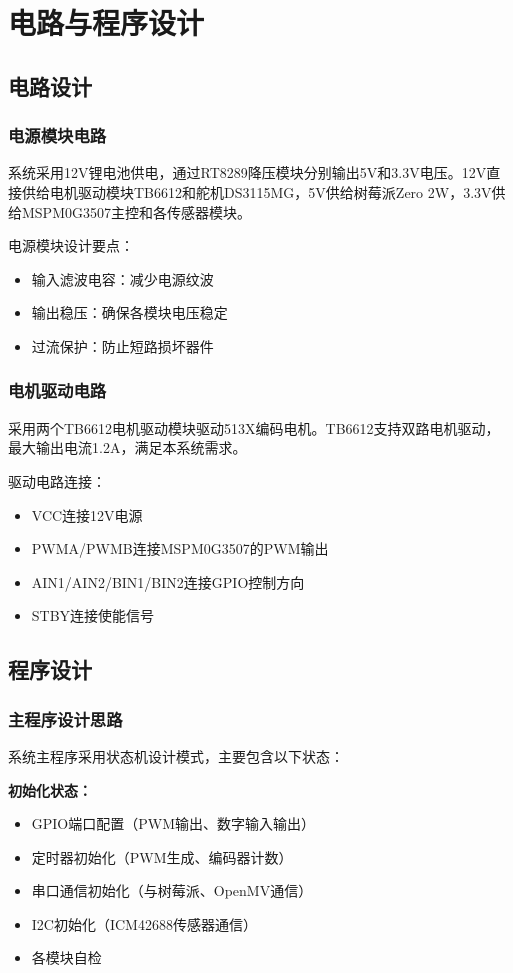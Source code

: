 \documentclass[UTF-8,zihao=-4]{ctexart}
\begin{document}
\section{电路与程序设计}
\subsection{电路设计}
\subsubsection{电源模块电路}
    系统采用12V锂电池供电，通过RT8289降压模块分别输出5V和3.3V电压。12V直接供给电机驱动模块TB6612和舵机DS3115MG，5V供给树莓派Zero 2W，3.3V供给MSPM0G3507主控和各传感器模块。
    
    电源模块设计要点：
    \begin{itemize}
        \item 输入滤波电容：减少电源纹波
        \item 输出稳压：确保各模块电压稳定
        \item 过流保护：防止短路损坏器件
    \end{itemize}

\subsubsection{电机驱动电路}
    采用两个TB6612电机驱动模块驱动513X编码电机。TB6612支持双路电机驱动，最大输出电流1.2A，满足本系统需求。
    
    驱动电路连接：
    \begin{itemize}
        \item VCC连接12V电源
        \item PWMA/PWMB连接MSPM0G3507的PWM输出
        \item AIN1/AIN2/BIN1/BIN2连接GPIO控制方向
        \item STBY连接使能信号
    \end{itemize}
\subsection{程序设计}
\subsubsection{主程序设计思路}
    系统主程序采用状态机设计模式，主要包含以下状态：
    
    \textbf{初始化状态：}
    \begin{itemize}
        \item GPIO端口配置（PWM输出、数字输入输出）
        \item 定时器初始化（PWM生成、编码器计数）
        \item 串口通信初始化（与树莓派、OpenMV通信）
        \item I2C初始化（ICM42688传感器通信）
        \item 各模块自检
    \end{itemize}
    
\end{document}
